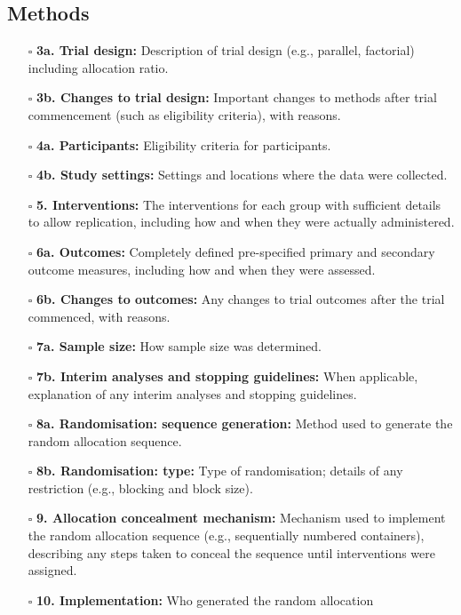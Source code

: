 \documentclass[11pt]{article}
\def\tightlist{}
\begin{document}
\begin{Form}
\subsection{Methods}\label{methods}

\begin{itemize}
\tightlist
\item[$\square$]
  \textbf{3a. Trial design:} Description of trial design (e.g.,
  parallel, factorial) including allocation ratio.
\item[$\square$]
  \textbf{3b. Changes to trial design:} Important changes to methods
  after trial commencement (such as eligibility criteria), with reasons.
\item[$\square$]
  \textbf{4a. Participants:} Eligibility criteria for participants.
\item[$\square$]
  \textbf{4b. Study settings:} Settings and locations where the data
  were collected.
\item[$\square$]
  \textbf{5. Interventions:} The interventions for each group with
  sufficient details to allow replication, including how and when they
  were actually administered.
\item[$\square$]
  \textbf{6a. Outcomes:} Completely defined pre-specified primary and
  secondary outcome measures, including how and when they were assessed.
\item[$\square$]
  \textbf{6b. Changes to outcomes:} Any changes to trial outcomes after
  the trial commenced, with reasons.
\item[$\square$]
  \textbf{7a. Sample size:} How sample size was determined.
\item[$\square$]
  \textbf{7b. Interim analyses and stopping guidelines:} When
  applicable, explanation of any interim analyses and stopping
  guidelines.
\item[$\square$]
  \textbf{8a. Randomisation: sequence generation:} Method used to
  generate the random allocation sequence.
\item[$\square$]
  \textbf{8b. Randomisation: type:} Type of randomisation; details of
  any restriction (e.g., blocking and block size).
\item[$\square$]
  \textbf{9. Allocation concealment mechanism:} Mechanism used to
  implement the random allocation sequence (e.g., sequentially numbered
  containers), describing any steps taken to conceal the sequence until
  interventions were assigned.
\item[$\square$]
  \textbf{10. Implementation:} Who generated the random allocation

\end{itemize}
\end{Form}
\end{document}
